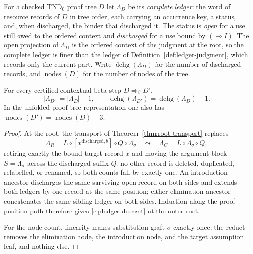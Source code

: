 \begin{definition}\label{def:proof-ledger}
For a checked $\mathrm{TND}_0$ proof tree $D$ let $\Lambda_D$ be its \emph{complete ledger}:
the word of resource records of $D$ in tree order, each carrying an occurrence key, a
status, and, when discharged, the binder that discharged it.  The status is
\emph{open} for a use still owed to the ordered context and \emph{discharged} for a use
bound by $(\multimap I)$.  The open projection of $\Lambda_D$ is the ordered context of the
judgment at the root, so the complete ledger is finer than the ledger of
Definition~\ref{def:ledger-judgment}, which records only the current part.  Write
$\operatorname{dchg}(\Lambda_D)$ for the number of discharged records, and
$\operatorname{nodes}(D)$ for the number of nodes of the tree.
\end{definition}

\begin{theorem}\label{thm:ledger-descent}
For every certified contextual beta step $D\Longrightarrow_\beta D'$,
\begin{equation}
  |\Lambda_{D'}|=|\Lambda_D|-1,
  \qquad
  \operatorname{dchg}(\Lambda_{D'})=\operatorname{dchg}(\Lambda_D)-1 .
  \label{eq:ledger-descent}
\end{equation}
In the unfolded proof-tree representation one also has
$\operatorname{nodes}(D')=\operatorname{nodes}(D)-3$.
\end{theorem}

\begin{proof}
At the root, the transport of Theorem~\ref{thm:root-transport} replaces
\[
  \Lambda_R
  =L\circ[x^{\mathrm{discharged},b}]\circ Q\circ\Lambda_\sigma
  \quad\leadsto\quad
  \Lambda_C
  =L\circ\Lambda_\sigma\circ Q ,
\]
retiring exactly the bound target record $x$ and moving the argument block $S=\Lambda_\sigma$
across the discharged suffix $Q$; no other record is deleted, duplicated, relabelled, or
renamed, so both counts fall by exactly one.  An introduction ancestor discharges the same
surviving open record on both sides and extends both ledgers by one record at the same
position; either elimination ancestor concatenates the same sibling ledger on both sides.
Induction along the proof-position path therefore gives \eqref{eq:ledger-descent} at the
outer root.

For the node count, linearity makes substitution graft $\sigma$ exactly once: the reduct
removes the elimination node, the introduction node, and the target assumption leaf, and
nothing else.
\end{proof}

